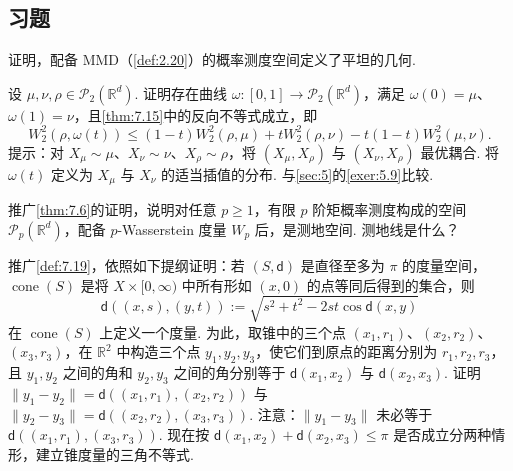 \subsection{习题}\label{sec:7.5}
\begin{exercise}\label{exer:7.1}
证明，配备 MMD（\autoref{def:2.20}）的概率测度空间定义了平坦的几何.
\end{exercise}

\begin{exercise}\label{exer:7.2}
设 $\mu,\nu,\rho\in\mathcal P_2(\mathbb R^d)$. 证明存在曲线 $\omega:[0,1]\to\mathcal P_2(\mathbb R^d)$，满足 $\omega(0)=\mu$、$\omega(1)=\nu$，且\autoref{thm:7.15}中的反向不等式成立，即
$$W_2^2(\rho,\omega(t))\le(1-t)W_2^2(\rho,\mu)+tW_2^2(\rho,\nu)-t(1-t)W_2^2(\mu,\nu).$$
提示：对 $X_\mu\sim\mu$、$X_\nu\sim\nu$、$X_\rho\sim\rho$，将 $(X_\mu,X_\rho)$ 与 $(X_\nu,X_\rho)$ 最优耦合. 将 $\omega(t)$ 定义为 $X_\mu$ 与 $X_\nu$ 的适当插值的分布. 与\autoref{sec:5}的\autoref{exer:5.9}比较.
\end{exercise}

\begin{exercise}\label{exer:7.3}
推广\autoref{thm:7.6}的证明，说明对任意 $p\ge1$，有限 $p$ 阶矩概率测度构成的空间 $\mathcal P_p(\mathbb R^d)$，配备 $p$-Wasserstein 度量 $W_p$ 后，是测地空间. 测地线是什么？
\end{exercise}

\begin{exercise}\label{exer:7.4}
推广\autoref{def:7.19}，依照如下提纲证明：若 $(S,\mathsf d)$ 是直径至多为 $\pi$ 的度量空间，$\operatorname{cone}(S)$ 是将 $X\times[0,\infty)$ 中所有形如 $(x,0)$ 的点等同后得到的集合，则
$$\mathsf d((x,s),(y,t)):=\sqrt{s^2+t^2-2st\cos\mathsf d(x,y)}$$
在 $\operatorname{cone}(S)$ 上定义一个度量. 为此，取锥中的三个点 $(x_1,r_1)$、$(x_2,r_2)$、$(x_3,r_3)$，在 $\mathbb R^2$ 中构造三个点 $y_1,y_2,y_3$，使它们到原点的距离分别为 $r_1,r_2,r_3$，且 $y_1,y_2$ 之间的角和 $y_2,y_3$ 之间的角分别等于 $\mathsf d(x_1,x_2)$ 与 $\mathsf d(x_2,x_3)$. 证明 $\lVert y_1-y_2\rVert=\mathsf d((x_1,r_1),(x_2,r_2))$ 与 $\lVert y_2-y_3\rVert=\mathsf d((x_2,r_2),(x_3,r_3))$. 注意：$\lVert y_1-y_3\rVert$ 未必等于 $\mathsf d((x_1,r_1),(x_3,r_3))$. 现在按 $\mathsf d(x_1,x_2)+\mathsf d(x_2,x_3)\le\pi$ 是否成立分两种情形，建立锥度量的三角不等式.
\end{exercise}
